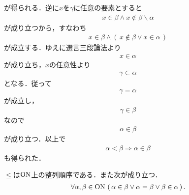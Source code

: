\begin{prf}
		が得られる．逆に$x$を$\gamma$に任意の要素とすると
		\begin{align}
			x \in \beta \wedge x \notin \beta \backslash \alpha
		\end{align}
		が成り立つから，すなわち
		\begin{align}
			x \in \beta \wedge (\, x \notin \beta \vee x \in \alpha\, )
		\end{align}
		が成立する．ゆえに選言三段論法より
		\begin{align}
			x \in \alpha
		\end{align}
		が成り立ち，$x$の任意性より
		\begin{align}
			\gamma \subset \alpha
		\end{align}
		となる．従って
		\begin{align}
			\gamma = \alpha
		\end{align}
		が成立し，
		\begin{align}
			\gamma \in \beta
		\end{align}
		なので
		\begin{align}
			\alpha \in \beta
		\end{align}
		が成り立つ．以上で
		\begin{align}
			\alpha < \beta \Longrightarrow \alpha \in \beta
		\end{align}
		も得られた．
		\QED
	\end{prf}
	
	\begin{screen}
		\begin{thm}[$\ON$の整列性]\label{thm:On_is_wellordered}
			$\leq$は$\ON$上の整列順序である．また次が成り立つ．
			\begin{align}
				\forall \alpha,\beta \in \mathrm{ON}\,
				\left(\, \alpha \in \beta \vee \alpha = \beta \vee \beta \in \alpha\, \right).
			\end{align}
		\end{thm}
	\end{screen}
	

